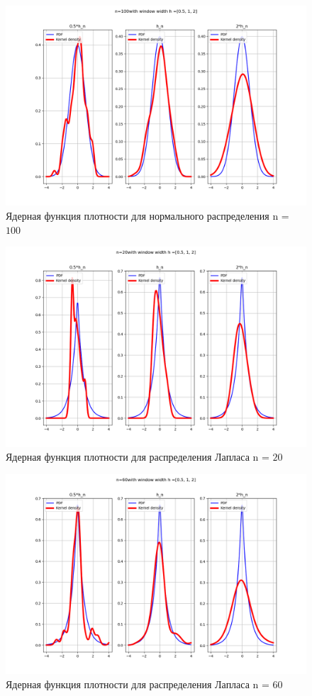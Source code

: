 \documentclass[a4]{article}
\begin{document}
\begin{center}
\begin{figure}[H]
	\caption{Ядерная функция плотности для нормального распределения n = $100$ }
	\includegraphics[width=\textwidth]{normal_pdf_100.png}
\end{figure}

\begin{figure}[H]
	\caption{Ядерная функция плотности для распределения Лапласа n = $20$ }
	\includegraphics[width=\textwidth]{laplace_pdf_20.png} 
\end{figure}

\begin{figure}[H]
	\caption{Ядерная функция плотности для распределения Лапласа n = $60$ }
	\includegraphics[width=\textwidth]{laplace_pdf_60.png} 
\end{figure}


\end{center}
\end{document}
